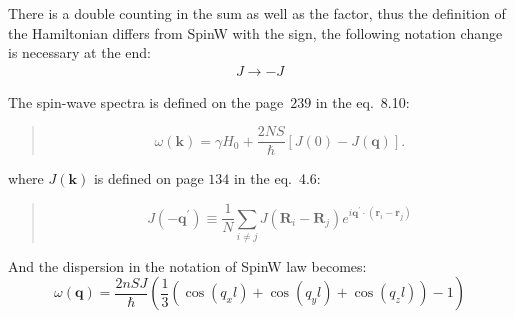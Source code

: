     There is a double counting in the sum as well as the factor, thus the definition of the Hamiltonian differs from SpinW with the sign, the following notation change is necessary at the end:
    \begin{equation}
        \begin{matrix} 
            J \rightarrow -J
        \end{matrix}
    \end{equation}

    The spin-wave spectra is defined on the page~$239$ in the eq.~8.10:
    \begin{quote}
        \begin{equation}
            \omega (\boldsymbol{k}) = \gamma H_0 + \dfrac{2NS}{\hbar}[J(0) - J(\boldsymbol{q})]. 
            \label{eq:qtom-8.10} \tag{8.10}
        \end{equation}
    \end{quote}
    where $J(\boldsymbol{k})$ is defined on page $134$ in the eq.~4.6:
    \begin{quote}
        \begin{equation}
            J(-\boldsymbol{q}^{\prime}) \equiv \dfrac{1}{N}\sum_{i \ne j}J(\boldsymbol{R}_i - \boldsymbol{R}_j)e^{i\boldsymbol{q}^{\prime}\cdot(\boldsymbol{r}_i - \boldsymbol{r}_j)}
            \label{eq:qtom-4.6} \tag{4.6}
        \end{equation}
    \end{quote}
    
    And the dispersion in the notation of SpinW law becomes:
    \begin{equation}
        \omega(\mathbf{q}) = \dfrac{2nSJ}{\hbar}\left(\dfrac{1}{3}\left(\cos(q_xl) + \cos(q_yl) + \cos(q_zl)\right) - 1\right)
    \end{equation}
